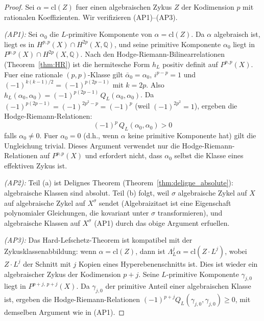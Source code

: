 \documentclass[aps,prd,twocolumn,superscriptaddress,nofootinbib]{revtex4-2}
\theoremstyle{definition}
\theoremstyle{remark}
\begin{document}
\begin{proof}
Sei $\alpha = \mathrm{cl}(Z)$ fuer einen algebraischen Zykus $Z$ der Kodimension $p$ mit rationalen Koeffizienten. Wir verifizieren (AP1)--(AP3).

\textit{(AP1):} Sei $\alpha_0$ die $L$-primitive Komponente von $\alpha = \mathrm{cl}(Z)$. Da $\alpha$ algebraisch ist, liegt es in $H^{p,p}(X) \cap H^{2p}(X, \mathbb{Q})$, und seine primitive Komponente $\alpha_0$ liegt in $P^{p,p}(X) \cap H^{2p}(X, \mathbb{Q})$. Nach den Hodge-Riemann-Bilinearrelationen (Theorem~\ref{thm:HR}) ist die hermitesche Form $h_L$ positiv definit auf $P^{p,p}(X)$. Fuer eine rationale $(p,p)$-Klasse gilt $\bar{\alpha}_0 = \alpha_0$, $i^{p-p} = 1$ und $(-1)^{k(k-1)/2} = (-1)^{p(2p-1)}$ mit $k = 2p$. Also $h_L(\alpha_0, \alpha_0) = (-1)^{p(2p-1)}\, Q_L(\alpha_0, \alpha_0)$. Da $(-1)^{p(2p-1)} = (-1)^{2p^2 - p} = (-1)^p$ (weil $(-1)^{2p^2} = 1$), ergeben die Hodge-Riemann-Relationen:
\begin{equation}
(-1)^p\, Q_L(\alpha_0, \alpha_0) > 0
\end{equation}
falls $\alpha_0 \neq 0$. Fuer $\alpha_0 = 0$ (d.h., wenn $\alpha$ keine primitive Komponente hat) gilt die Ungleichung trivial. Dieses Argument verwendet nur die Hodge-Riemann-Relationen auf $P^{p,p}(X)$ und erfordert nicht, dass $\alpha_0$ selbst die Klasse eines effektiven Zykus ist.

\textit{(AP2):} Teil (a) ist Delignes Theorem (Theorem~\ref{thm:deligne_absolute}): algebraische Klassen sind absolut. Teil (b) folgt, weil $\sigma$ algebraische Zykel auf $X$ auf algebraische Zykel auf $X^\sigma$ sendet (Algebraizitaet ist eine Eigenschaft polynomialer Gleichungen, die kovariant unter $\sigma$ transformieren), und algebraische Klassen auf $X^\sigma$ (AP1) durch das obige Argument erfuellen.

\textit{(AP3):} Das Hard-Lefschetz-Theorem ist kompatibel mit der Zykusklassenabbildung: wenn $\alpha = \mathrm{cl}(Z)$, dann ist $\Lambda_L^j \alpha = \mathrm{cl}(Z \cdot L^j)$, wobei $Z \cdot L^j$ der Schnitt mit $j$ Kopien eines Hyperebenenschnitts ist. Dies ist wieder ein algebraischer Zykus der Kodimension $p + j$. Seine $L$-primitive Komponente $\gamma_{j,0}$ liegt in $P^{p+j,\,p+j}(X)$. Da $\gamma_{j,0}$ der primitive Anteil einer algebraischen Klasse ist, ergeben die Hodge-Riemann-Relationen $(-1)^{p+j} Q_L(\gamma_{j,0}, \gamma_{j,0}) \geq 0$, mit demselben Argument wie in (AP1).
\end{proof}


\end{document}
